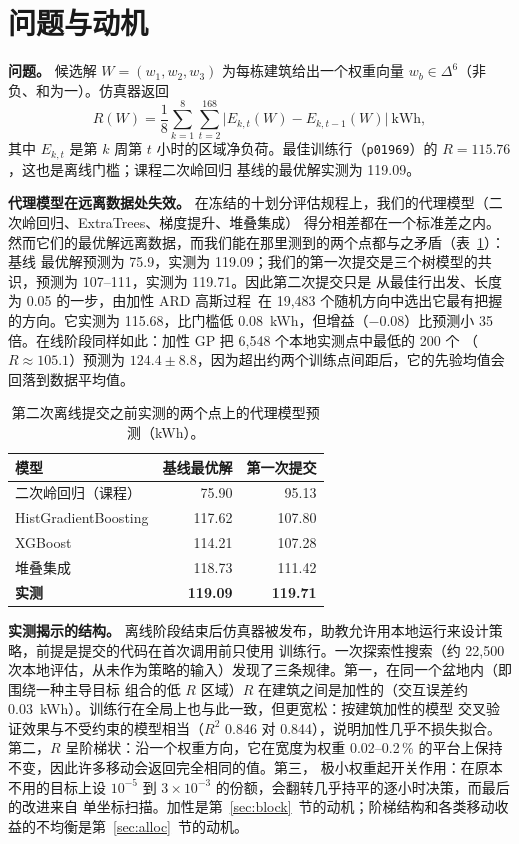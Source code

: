 \section{问题与动机}
\label{sec:problem}
\textbf{问题。} 候选解 $W=(w_1,w_2,w_3)$ 为每栋建筑给出一个权重向量 $w_b\in\Delta^6$（非负、和为一）。仿真器返回
\begin{equation}
R(W)=\frac{1}{8}\sum_{k=1}^{8}\sum_{t=2}^{168}\bigl|E_{k,t}(W)-E_{k,t-1}(W)\bigr|\ \text{kWh},
\label{eq:R}
\end{equation}
其中 $E_{k,t}$ 是第 $k$ 周第 $t$ 小时的区域净负荷。最佳训练行（\texttt{p01969}）的 $R=115.76$，这也是离线门槛；课程二次岭回归
基线的最优解实测为 119.09。

\textbf{代理模型在远离数据处失效。} 在冻结的十划分评估规程上，我们的代理模型（二次岭回归、ExtraTrees、梯度提升、堆叠集成）
得分相差都在一个标准差之内。然而它们的最优解远离数据，而我们能在那里测到的两个点都与之矛盾（表~\ref{tab:offline}）：基线
最优解预测为 75.9，实测为 119.09；我们的第一次提交是三个树模型的共识，预测为 107--111，实测为 119.71。因此第二次提交只是
从最佳行出发、长度为 0.05 的一步，由加性 ARD 高斯过程~\cite{rasmussen}在 19,483 个随机方向中选出它最有把握的方向。它实测为
115.68，比门槛低 0.08~kWh，但增益（$-0.08$）比预测小 35 倍。在线阶段同样如此：加性 GP 把 6,548 个本地实测点中最低的 200 个
（$R\approx105.1$）预测为 $124.4\pm8.8$，因为超出约两个训练点间距后，它的先验均值会回落到数据平均值。

\begin{table}[t]
\centering
\caption{第二次离线提交之前实测的两个点上的代理模型预测（kWh）。}
\label{tab:offline}
\begin{tabular}{lrr}
\toprule
模型 & 基线最优解 & 第一次提交\\
\midrule
二次岭回归（课程） & 75.90 & 95.13\\
HistGradientBoosting & 117.62 & 107.80\\
XGBoost & 114.21 & 107.28\\
堆叠集成 & 118.73 & 111.42\\
\midrule
\textbf{实测} & \textbf{119.09} & \textbf{119.71}\\
\bottomrule
\end{tabular}
\end{table}

\textbf{实测揭示的结构。} 离线阶段结束后仿真器被发布，助教允许用本地运行来设计策略，前提是提交的代码在首次调用前只使用
训练行。一次探索性搜索（约 22,500 次本地评估，从未作为策略的输入）发现了三条规律。第一，在同一个盆地内（即围绕一种主导目标
组合的低 $R$ 区域）$R$ 在建筑之间是加性的（交互误差约 0.03~kWh）。训练行在全局上也与此一致，但更宽松：按建筑加性的模型
交叉验证效果与不受约束的模型相当（$R^2$ 0.846 对 0.844），说明加性几乎不损失拟合。
第二，$R$ 呈阶梯状：沿一个权重方向，它在宽度为权重 0.02--0.2\,\% 的平台上保持不变，因此许多移动会返回完全相同的值。第三，
极小权重起开关作用：在原本不用的目标上设 $10^{-5}$ 到 $3\times10^{-3}$ 的份额，会翻转几乎持平的逐小时决策，而最后的改进来自
单坐标扫描。加性是第~\ref{sec:block}~节的动机；阶梯结构和各类移动收益的不均衡是第~\ref{sec:alloc}~节的动机。
